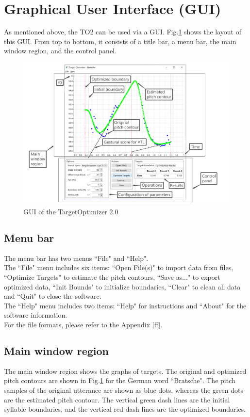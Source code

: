 \section{ Graphical User Interface (GUI)}
As mentioned above, the TO2 can be used via a GUI. Fig.\ref{GUI} shows the layout of this GUI. From top to bottom, it consists of a title bar, a menu bar, the main window region, and the control panel. 
\begin{figure}[H]
\centering
\includegraphics[width=\textwidth]{images/GUI.png}
\caption{GUI of the TargetOptimizer 2.0}
\label{GUI}
\end{figure}

\subsection*{Menu bar} 
The menu bar has two menus ``File" and ``Help".\\ 
The ``File" menu includes six items: ``Open File(s)" to import data from files, ``Optimize Targets" to estimate the pitch contours, ``Save as..." to export optimized data, ``Init Bounds" to initialize boundaries, ``Clear" to clean all data and ``Quit" to close the software.\\ 
The ``Help" menu includes two items: ``Help" for instructions and ``About" for the software information.\\
For the file formats, please refer to the Appendix \ref{ff}.

\subsection*{Main window region}
The main window region shows the graphs of targets. The original and optimized pitch contours are shown in Fig.\ref{GUI} for the German word ``Bratsche". The pitch samples of the original utterance are shown as blue dots, whereas the green dots are the estimated pitch contour. The vertical green dash lines are the initial syllable boundaries, and the vertical red dash lines are the optimized boundaries.

